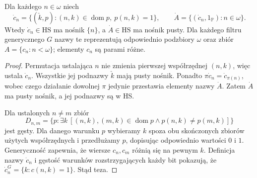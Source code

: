 \begin{lemat}
\label{lem:sym36-cohen-family}
Dla każdego $n\in\omega$ niech
\[
 \dot c_n=
 \{(\check k,p):
     (n,k)\in\operatorname{dom}p,\
     p(n,k)=1\},\qquad
 \dot A=\{(\dot c_n,1_{\mathbb P}):n\in\omega\}.
\]
Wtedy $\dot c_n\in\mathrm{HS}$
ma nośnik $\{n\}$, a
$\dot A\in\mathrm{HS}$ ma nośnik pusty.
Dla każdego filtru generycznego $G$
nazwy te reprezentują odpowiednio
podzbiory $\omega$ oraz zbiór
$A=\{c_n:n<\omega\}$;
elementy $c_n$ są parami różne.
\end{lemat}
\begin{proof}
Permutacja ustalająca $n$ nie zmienia
pierwszej współrzędnej $(n,k)$, więc
ustala $\dot c_n$. Wszystkie jej podnazwy
$\check k$ mają pusty nośnik.
Ponadto $\pi\dot c_n=\dot c_{\pi(n)}$,
wobec czego działanie dowolnej $\pi$
jedynie przestawia elementy nazwy $\dot A$.
Zatem $\dot A$ ma pusty nośnik,
a jej podnazwy są w HS.

Dla ustalonych $n\ne m$ zbiór
\[
 D_{n,m}=\{p:\exists k\
 [(n,k),(m,k)\in\operatorname{dom}p
   \land p(n,k)\ne p(m,k)]\}
\]
jest gęsty. Dla danego warunku $p$
wybieramy $k$ spoza obu skończonych
zbiorów użytych współrzędnych
i przedłużamy $p$, dopisując
odpowiednio wartości $0$ i $1$.
Generyczność zapewnia, że wiersze
$c_n,c_m$ różnią się na pewnym $k$.
Definicja nazwy $\dot c_n$ i gęstość
warunków rozstrzygających każdy bit
pokazują, że $\dot c_n^G
=\{k:c(n,k)=1\}$. Stąd teza.
\end{proof}

